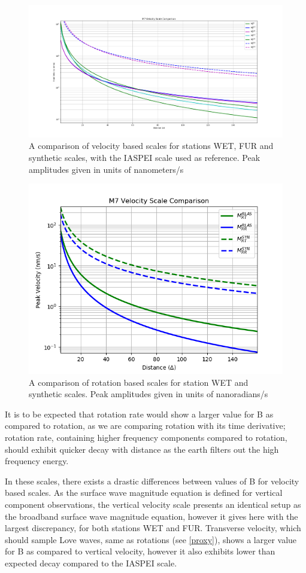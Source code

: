 \documentclass{gji}
\begin{document}
\begin{figure}
\centerline{\includegraphics[width=.5\textwidth]{scale_compare}}
\caption{A comparison of velocity based scales for stations WET, FUR and synthetic scales, with the IASPEI scale used as reference. Peak amplitudes given in units of nanometers/s}
\label{fig:scale_comp}
\end{figure}

\begin{figure}
\centerline{\includegraphics[width=.5\textwidth]{rr_scales_compare}}
\caption{A comparison of rotation based scales for station WET and synthetic scales. Peak amplitudes given in units of nanoradians/s}
\label{fig:scale_comp}
\end{figure}

It is to be expected that rotation rate would show a larger value for B as compared to rotation, as we are comparing rotation with its time derivative; rotation rate, containing higher frequency components compared to rotation, should exhibit quicker decay with distance as the earth filters out the high frequency energy. 

In these scales, there exists a drastic differences between values of B for velocity based scales. As the surface wave magnitude equation is defined for vertical component observations, the vertical velocity scale presents an identical setup as the broadband surface wave magnitude equation, however it gives here with the largest discrepancy, for both stations WET and FUR.  Transverse velocity, which should sample Love waves, same as rotations (see \ref{proxy}), shows a larger value for B as compared to vertical velocity, however it also exhibits lower than expected decay compared to the IASPEI scale. 
\end{document}
